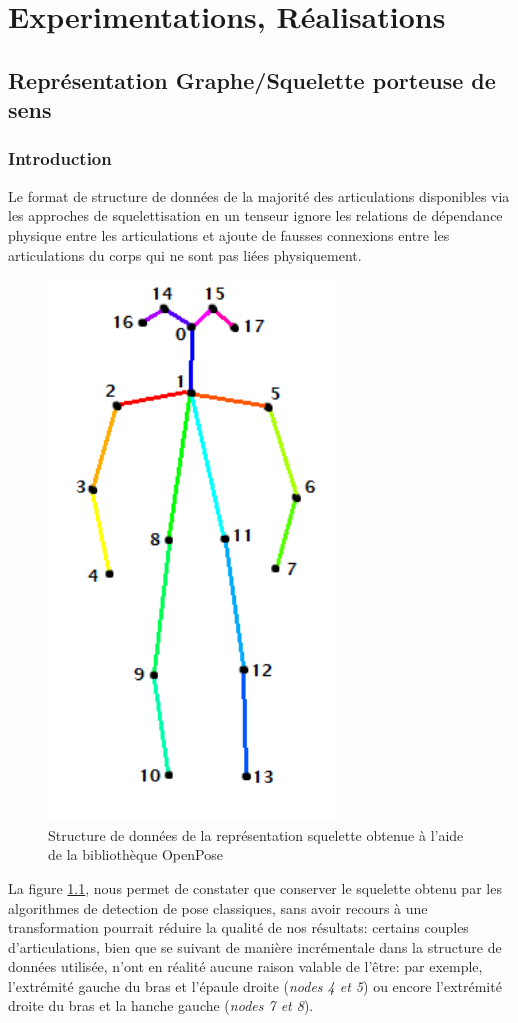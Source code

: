 \clearpage
\chapter{Experimentations, Réalisations}
\label{sec:SOTA}

\section{Représentation Graphe/Squelette porteuse de sens}

\subsection{Introduction}
Le format de structure de données de la majorité des articulations disponibles via les approches de squelettisation en un tenseur ignore les relations de dépendance physique entre les articulations et ajoute de fausses connexions entre les articulations du corps qui ne sont pas liées physiquement.

\begin{figure}[H]
    \centering
    \includegraphics[width=0.3\linewidth]{Images/openpose.png}
    \caption{Structure de données de la représentation squelette obtenue à l'aide de la bibliothèque OpenPose \cite{cao2017realtime}}
    \label{fig:openPoseSkel}
\end{figure}

La figure \ref{fig:openPoseSkel}, nous permet de constater que conserver le squelette obtenu par les algorithmes de detection de pose classiques, sans avoir recours à une transformation pourrait réduire la qualité de nos résultats: certains couples d'articulations, bien que se suivant de manière incrémentale dans la structure de données utilisée, n'ont en réalité aucune raison valable de l'être: par exemple, l'extrémité gauche du bras et l'épaule droite (\textit{nodes 4 et 5}) ou encore l'extrémité droite du bras et la hanche gauche (\textit{nodes 7 et 8}).

